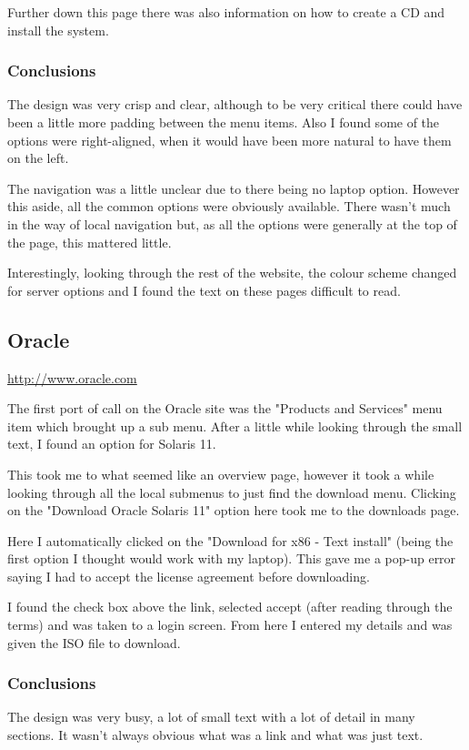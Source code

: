 \documentclass[10pt,letterpaper]{article}
\begin{document}
      Further down this page there was also information on how to create a CD and install the system.
      
      \subsubsection{Conclusions}
	The design was very crisp and clear, although to be very critical there could have been a little more padding between the menu items. Also I found some of the options were right-aligned, when it would have been more natural to have them on the left.
	
	The navigation was a little unclear due to there being no laptop option. However this aside, all the common options were obviously available. There wasn't much in the way of local navigation but, as all the options were generally at the top of the page, this mattered little.
	
	Interestingly, looking through the rest of the website, the colour scheme changed for server options and I found the text on these pages difficult to read.
    
    \subsection{Oracle}
      \url{http://www.oracle.com}
      
      The first port of call on the Oracle site was the "Products and Services" menu item which brought up a sub menu. After a little while looking through the small text, I found an option for Solaris 11.
      
      This took me to what seemed like an overview page, however it took a while looking through all the local submenus to just find the download menu. Clicking on the "Download Oracle Solaris 11" option here took me to the downloads page.
      
      Here I automatically clicked on the "Download for x86 - Text install" (being the first option I thought would work with my laptop). This gave me a pop-up error saying I had to accept the license agreement before downloading.
      
      I found the check box above the link, selected accept (after reading through the terms) and was taken to a login screen. From here I entered my details and was given the ISO file to download.
      
      \subsubsection{Conclusions}
	The design was very busy, a lot of small text with a lot of detail in many sections. It wasn't always obvious what was a link and what was just text.
	
\end{document}
